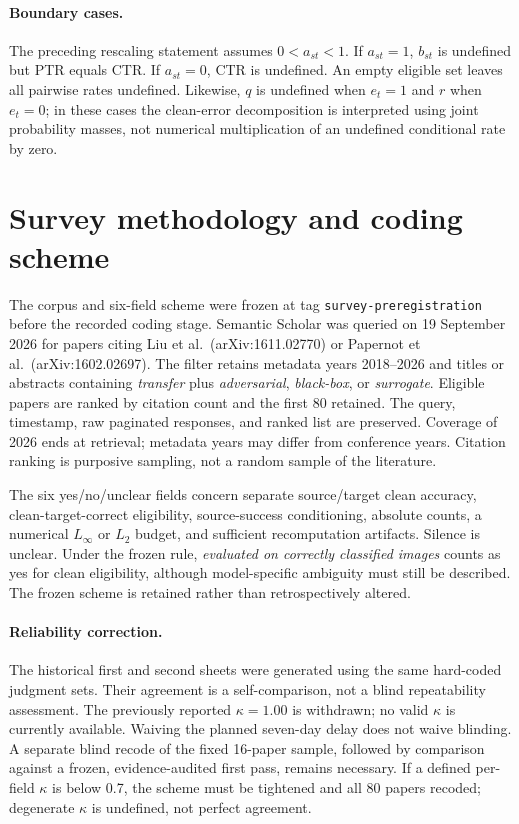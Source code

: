\documentclass[10pt]{article}
\begin{document}
\paragraph{Boundary cases.}
The preceding rescaling statement assumes $0<a_{st}<1$. If $a_{st}=1$, $b_{st}$ is undefined but PTR equals CTR. If $a_{st}=0$, CTR is undefined. An empty eligible set leaves all pairwise rates undefined.
Likewise, $q$ is undefined when $e_t=1$ and $r$ when $e_t=0$; in these cases the clean-error decomposition is interpreted using joint probability masses, not numerical multiplication of an undefined conditional rate by zero.

\section{Survey methodology and coding scheme}
The corpus and six-field scheme were frozen at tag \texttt{survey-preregistration} before the recorded coding stage. Semantic Scholar was queried on 19 September 2026 for papers citing Liu et al.\ (arXiv:1611.02770) or Papernot et al.\ (arXiv:1602.02697). The filter retains metadata years 2018--2026 and titles or abstracts containing \emph{transfer} plus \emph{adversarial}, \emph{black-box}, or \emph{surrogate}. Eligible papers are ranked by citation count and the first 80 retained. The query, timestamp, raw paginated responses, and ranked list are preserved. Coverage of 2026 ends at retrieval; metadata years may differ from conference years. Citation ranking is purposive sampling, not a random sample of the literature.

The six yes/no/unclear fields concern separate source/target clean accuracy, clean-target-correct eligibility, source-success conditioning, absolute counts, a numerical $L_\infty$ or $L_2$ budget, and sufficient recomputation artifacts. Silence is unclear. Under the frozen rule, \emph{evaluated on correctly classified images} counts as yes for clean eligibility, although model-specific ambiguity must still be described. The frozen scheme is retained rather than retrospectively altered.

\paragraph{Reliability correction.}
The historical first and second sheets were generated using the same hard-coded judgment sets. Their agreement is a self-comparison, not a blind repeatability assessment. The previously reported $\kappa=1.00$ is withdrawn; no valid $\kappa$ is currently available. Waiving the planned seven-day delay does not waive blinding. A separate blind recode of the fixed 16-paper sample, followed by comparison against a frozen, evidence-audited first pass, remains necessary. If a defined per-field $\kappa$ is below 0.7, the scheme must be tightened and all 80 papers recoded; degenerate $\kappa$ is undefined, not perfect agreement.
\end{document}
